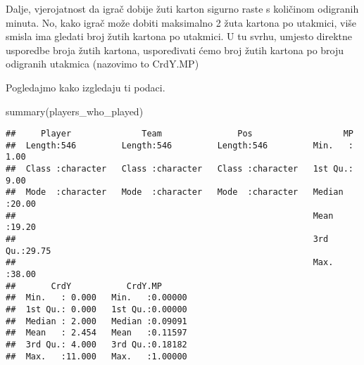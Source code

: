 \documentclass[
]{article}
\newenvironment{Shaded}{\begin{snugshade}}{\end{snugshade}}
\newcommand{\AttributeTok}[1]{\textcolor[rgb]{0.77,0.63,0.00}{#1}}
\newcommand{\FunctionTok}[1]{\textcolor[rgb]{0.00,0.00,0.00}{#1}}
\newcommand{\NormalTok}[1]{#1}
\newcommand{\OtherTok}[1]{\textcolor[rgb]{0.56,0.35,0.01}{#1}}
\newcommand{\SpecialCharTok}[1]{\textcolor[rgb]{0.00,0.00,0.00}{#1}}
\newcommand{\StringTok}[1]{\textcolor[rgb]{0.31,0.60,0.02}{#1}}
\begin{document}
Dalje, vjerojatnost da igrač dobije žuti karton sigurno raste s
količinom odigranih minuta. No, kako igrač može dobiti maksimalno 2 žuta
kartona po utakmici, više smisla ima gledati broj žutih kartona po
utakmici. U tu svrhu, umjesto direktne usporedbe broja žutih kartona,
uspoređivati ćemo broj žutih kartona po broju odigranih utakmica
(nazovimo to CrdY.MP)

\begin{Shaded}
\end{Shaded}

Pogledajmo kako izgledaju ti podaci.

\begin{Shaded}
\begin{Highlighting}[]
\FunctionTok{summary}\NormalTok{(players\_who\_played)}
\end{Highlighting}
\end{Shaded}

\begin{verbatim}
##     Player              Team               Pos                  MP       
##  Length:546         Length:546         Length:546         Min.   : 1.00  
##  Class :character   Class :character   Class :character   1st Qu.: 9.00  
##  Mode  :character   Mode  :character   Mode  :character   Median :20.00  
##                                                           Mean   :19.20  
##                                                           3rd Qu.:29.75  
##                                                           Max.   :38.00  
##       CrdY           CrdY.MP       
##  Min.   : 0.000   Min.   :0.00000  
##  1st Qu.: 0.000   1st Qu.:0.00000  
##  Median : 2.000   Median :0.09091  
##  Mean   : 2.454   Mean   :0.11597  
##  3rd Qu.: 4.000   3rd Qu.:0.18182  
##  Max.   :11.000   Max.   :1.00000
\end{verbatim}

\begin{Shaded}
\end{Shaded}
\end{document}
